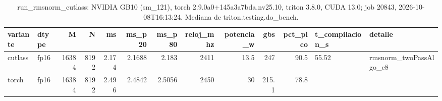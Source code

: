 \begin{table}[htbp]
  \centering\small
  \begin{tabular}{llrrrrrrrrrll}
    \toprule
    variante & dtype & M & N & ms & ms\_p20 & ms\_p80 & reloj\_mhz & potencia\_w & gbs & pct\_pico & t\_compilacion\_s & detalle \\
    \midrule
    cutlass & fp16 & 16384 & 8192 & 2.174 & 2.1688 & 2.183 & 2411 & 13.5 & 247 & 90.5 & 55.52 & rmsnorm\_twoPassAlgo\_e8 \\
    torch & fp16 & 16384 & 8192 & 2.496 & 2.4842 & 2.5056 & 2450 & 30 & 215.1 & 78.8 &  &  \\
    \bottomrule
  \end{tabular}
  \caption{run\_rmsnorm\_cutlass: NVIDIA GB10 (sm\_121), torch 2.9.0a0+145a3a7bda.nv25.10, triton 3.8.0, CUDA 13.0; job 20843, 2026-10-08T16:13:24. Mediana de triton.testing.do\_bench.}
  \label{tab:hennessy-frio-run-rmsnorm-cutlass}
\end{table}
